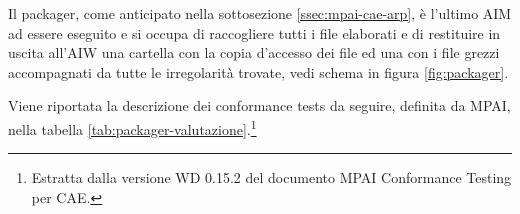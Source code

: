 
Il packager, come anticipato nella sottosezione \ref{ssec:mpai-cae-arp}, è l'ultimo \ac{AIM} ad essere eseguito e si occupa di raccogliere tutti i file elaborati e di restituire in uscita all'\ac{AIW} una cartella con la copia d'accesso dei file ed una con i file grezzi accompagnati da tutte le irregolarità trovate, vedi schema in figura \ref{fig:packager}.

Viene riportata la descrizione dei conformance tests da seguire, definita da MPAI, nella tabella \ref{tab:packager-valutazione}.\footnote{Estratta dalla versione WD 0.15.2 del documento MPAI Conformance Testing per \ac{CAE}.} 

